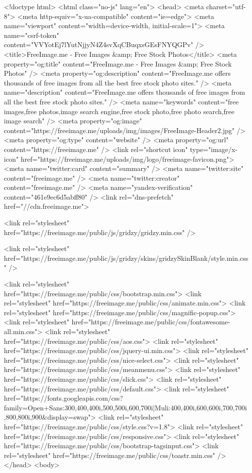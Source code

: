 <!doctype html>
<html class="no-js" lang="en">
<head>
<meta charset="utf-8">
<meta http-equiv="x-ua-compatible" content="ie=edge">
<meta name="viewport" content="width=device-width, initial-scale=1">
<meta name="csrf-token" content="VVYotEj7lYutNjjyN4Z4svXqCBuqxsGEsFNYQGPv" />
<title>FreeImage.me - Free Images &amp; Free Stock Photos</title>
<meta property="og:title" content="FreeImage.me - Free Images &amp; Free Stock Photos" />
<meta property="og:description" content="FreeImage.me offers thousands of free images from all the best free stock photo sites." />
<meta name="description" content="FreeImage.me offers thousands of free images from all the best free stock photo sites." />
<meta name="keywords" content="free images,free photos,image search engine,free stock photo,free photo search,free image search" />
<meta property="og:image" content="https://freeimage.me/uploads/img/images/FreeImage-Header2.jpg" />
<meta property="og:type" content="website" />
<meta property="og:url" content="https://freeimage.me" />
<link rel="shortcut icon" type="image/x-icon" href="https://freeimage.me/uploads/img/logo/freeimage-favicon.png">
<meta name="twitter:card" content="summary" />
<meta name="twitter:site" content="freeimage.me" />
<meta name="twitter:creator" content="freeimage.me" />
<meta name="yandex-verification" content="461e9ec6d5abff80" />
<link rel="dns-prefetch" href="//cdn.freeimage.me">

<link rel="stylesheet" href="https://freeimage.me/public/js/gridzy/gridzy.min.css" />

<link rel="stylesheet" href="https://freeimage.me/public/js/gridzy/skins/gridzySkinBlank/style.min.css" />

<link rel="stylesheet" href="https://freeimage.me/public/css/bootstrap.min.css">
<link rel="stylesheet" href="https://freeimage.me/public/css/animate.min.css">
<link rel="stylesheet" href="https://freeimage.me/public/css/magnific-popup.css">
<link rel="stylesheet" href="https://freeimage.me/public/css/fontawesome-all.min.css">
<link rel="stylesheet" href="https://freeimage.me/public/css/aos.css">
<link rel="stylesheet" href="https://freeimage.me/public/css/jquery-ui.min.css">
<link rel="stylesheet" href="https://freeimage.me/public/css/nice-select.css">
<link rel="stylesheet" href="https://freeimage.me/public/css/meanmenu.css">
<link rel="stylesheet" href="https://freeimage.me/public/css/slick.css">
<link rel="stylesheet" href="https://freeimage.me/public/css/default.css">
<link rel="stylesheet" href="https://fonts.googleapis.com/css?family=Open+Sans:300,400,400i,500,500i,600,700i|Muli:400,400i,600,600i,700,700i,800,800i,900&display=swap">
<link rel="stylesheet" href="https://freeimage.me/public/css/style.css?v=1.8">
<link rel="stylesheet" href="https://freeimage.me/public/css/responsive.css">
<link rel="stylesheet" href="https://freeimage.me/public/css/bootstrap-tagsinput.css">
<link rel="stylesheet" href="https://freeimage.me/public/css/toastr.min.css" />
</head>
<body>

